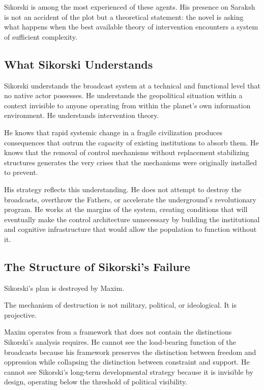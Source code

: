 \documentclass[12pt, a4paper]{article}
\theoremstyle{plain}
\theoremstyle{definition}
\theoremstyle{remark}
\begin{document}
Sikorski is among the most experienced of these
agents. His presence on Saraksh is not an accident
of the plot but a theoretical statement: the novel
is asking what happens when the best available
theory of intervention encounters a system of
sufficient complexity.

\subsection{What Sikorski Understands}

Sikorski understands the broadcast system at a
technical and functional level that no native
actor possesses. He understands the geopolitical
situation within a context invisible to anyone
operating from within the planet's own information
environment. He understands intervention theory.

He knows that rapid systemic change in a fragile
civilization produces consequences that outrun the
capacity of existing institutions to absorb them.
He knows that the removal of control mechanisms
without replacement stabilizing structures
generates the very crises that the mechanisms
were originally installed to prevent.

His strategy reflects this understanding. He does
not attempt to destroy the broadcasts, overthrow
the Fathers, or accelerate the underground's
revolutionary program. He works at the margins
of the system, creating conditions that will
eventually make the control architecture
unnecessary by building the institutional and
cognitive infrastructure that would allow the
population to function without it.

\subsection{The Structure of Sikorski's Failure}

Sikorski's plan is destroyed by Maxim.

The mechanism of destruction is not military,
political, or ideological. It is projective.

Maxim operates from a framework that does not
contain the distinctions Sikorski's analysis
requires. He cannot see the load-bearing function
of the broadcasts because his framework preserves
the distinction between freedom and oppression
while collapsing the distinction between constraint
and support. He cannot see Sikorski's long-term
developmental strategy because it is invisible
by design, operating below the threshold of
political visibility.
\end{document}
